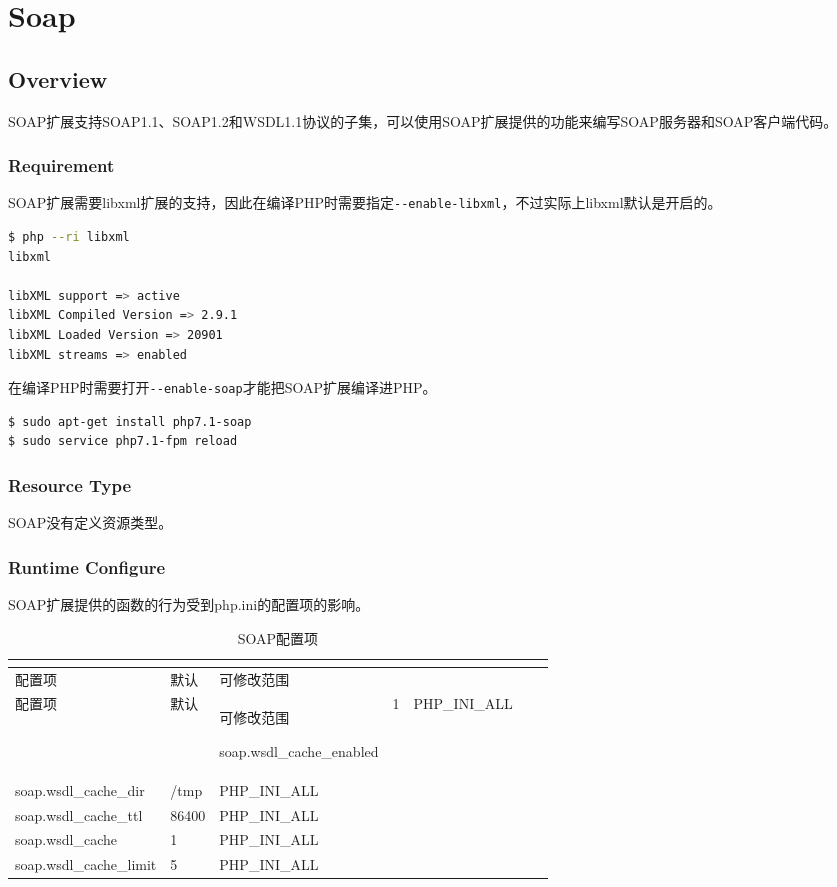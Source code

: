 \part{Soap}


\chapter{Overview}

SOAP扩展支持SOAP1.1、SOAP1.2和WSDL1.1协议的子集，可以使用SOAP扩展提供的功能来编写SOAP服务器和SOAP客户端代码。


\section{Requirement}

SOAP扩展需要libxml扩展的支持，因此在编译PHP时需要指定\texttt{-\/-enable-libxml}，不过实际上libxml默认是开启的。

\begin{lstlisting}[language=bash]
$ php --ri libxml
libxml

libXML support => active
libXML Compiled Version => 2.9.1
libXML Loaded Version => 20901
libXML streams => enabled
\end{lstlisting}

在编译PHP时需要打开\texttt{-\/-enable-soap}才能把SOAP扩展编译进PHP。

\begin{lstlisting}[language=bash]
$ sudo apt-get install php7.1-soap
$ sudo service php7.1-fpm reload
\end{lstlisting}


\section{Resource Type}

SOAP没有定义资源类型。


\section{Runtime Configure}


SOAP扩展提供的函数的行为受到php.ini的配置项的影响。


\begin{longtable}{|m{150pt}|m{40pt}|m{120pt}|}
\tabularnewline\hline
配置项&默认&可修改范围
\endhead

\caption{SOAP配置项}\\
\hline
配置项&默认&可修改范围
\endfirsthead

\endfoot

\endlastfoot
\hline
soap.wsdl\_cache\_enabled	&1		&PHP\_INI\_ALL	\\
\hline
soap.wsdl\_cache\_dir		&/tmp	&PHP\_INI\_ALL	\\
\hline
soap.wsdl\_cache\_ttl		&86400	&PHP\_INI\_ALL	\\
\hline
soap.wsdl\_cache			&1		&PHP\_INI\_ALL	\\
\hline
soap.wsdl\_cache\_limit		&5		&PHP\_INI\_ALL\\
\hline
\end{longtable}

